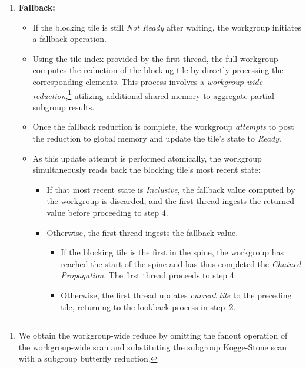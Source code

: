 \documentclass[acmsmall, manuscript, screen, review, anonymous]{acmart}
\begin{document}
\begin{enumerate}
  \item \textbf{Fallback:}
        \begin{itemize}
          \item If the blocking tile is still \emph{Not Ready} after waiting, the workgroup initiates a fallback operation.
          \item Using the tile index provided by the first thread, the full workgroup computes the reduction of the blocking tile by directly processing the corresponding elements. This process involves a \emph{workgroup-wide reduction},\footnote{We obtain the workgroup-wide reduce by omitting the fanout operation of the workgroup-wide scan and substituting the subgroup Kogge-Stone scan with a subgroup butterfly reduction.} utilizing additional shared memory to aggregate partial subgroup results.
          \item Once the fallback reduction is complete, the workgroup \emph{attempts} to post the reduction to global memory and update the tile's state to \emph{Ready}.
          \item As this update attempt is performed atomically, the workgroup simultaneously reads back the blocking tile's most recent state:
                \begin{itemize}
                  \item If that most recent state is \emph{Inclusive}, the fallback value computed by the workgroup is discarded, and the first thread ingests the returned value before proceeding to step 4.
                  \item Otherwise, the first thread ingests the fallback value.
                        \begin{itemize}
                          \item If the blocking tile is the first in the spine, the workgroup has reached the start of the spine and has thus completed the \emph{Chained Propagation}. The first thread proceeds to step 4.
                          \item Otherwise, the first thread updates \emph{current tile} to the preceding tile, returning to the lookback process in step~2.
                        \end{itemize}
                \end{itemize}
        \end{itemize}


\end{enumerate}
\end{document}
